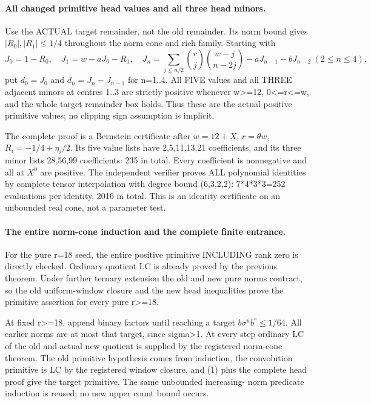 \paragraph{All changed primitive head values and all three head minors.}
Use the ACTUAL target remainder, not the old remainder. Its norm
bound gives $|R_0|,|R_1|\le1/4$ throughout the norm cone and rich
family. Starting with
\[
 J_0=1-R_0,\quad J_1=w-aJ_0-R_1,\quad
 J_n=\sum_{j\le n/2}{r\choose j}{w-j\choose n-2j}
                       -aJ_{n-1}-bJ_{n-2}\ (2\le n\le4),
\]
put $d_0=J_0$ and $d_n=J_n-J_{n-1}$ for n=1..4.
All FIVE values and all THREE adjacent minors at centres 1..3
are strictly positive whenever w>=12, 0<=r<=w, and the whole
target remainder box holds. Thus these are the actual positive
primitive values; no clipping sign assumption is implicit.

The complete proof is a Bernstein certificate after
$w=12+X$, $r=\theta w$, $R_i=-1/4+\eta_i/2$.
Its five value lists have 2,5,11,13,21 coefficients, and its
three minor lists 28,56,99 coefficients: 235 in total.
Every coefficient is nonnegative and all at $X^0$ are positive.
The independent verifier proves ALL polynomial identities by
complete tensor interpolation with degree bound (6,3,2,2):
7*4*3*3=252 evaluations per identity, 2016 in total. This is an
identity certificate on an unbounded real cone, not a parameter test.

\paragraph{The entire norm-cone induction and the complete finite entrance.}
For the pure r=18 seed, the entire positive primitive INCLUDING
rank zero is directly checked. Ordinary quotient LC is already
proved by the previous theorem. Under further ternary extension
the old and new pure norms contract, so the old uniform-window
closure and the new head inequalities prove the primitive assertion
for every pure r>=18.

At fixed r>=18, append binary factors until reaching a target
$b\sigma^u b^r\le1/64$. All earlier norms are at most that target,
since sigma>1. At every step ordinary LC of the old and actual new
quotient is supplied by the registered norm-cone theorem. The old
primitive hypothesis comes from induction, the convolution primitive
is LC by the registered window closure, and (1) plus the complete
head proof give the target primitive. The same unbounded increasing-
norm predicate induction is reused; no new upper count bound occurs.

